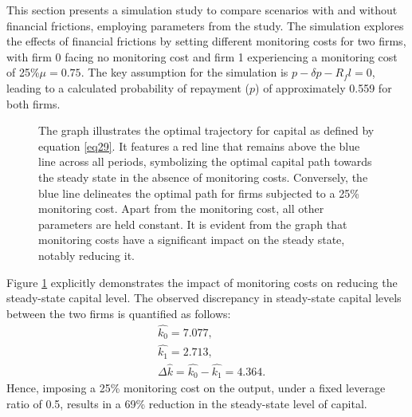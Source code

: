 \documentclass[12pt]{report}
\begin{document}
This section presents a simulation study to compare scenarios with and without financial frictions, employing parameters
from the \cite{OsePap17} study. The simulation explores the effects of financial frictions by setting different
monitoring costs for two firms, with firm 0 facing no monitoring cost and firm 1 experiencing a monitoring cost of
25\%\(\mu =0.75 \).
The key assumption for the simulation is \( p - \delta p - R_f l = 0 \), leading to a calculated probability of
repayment (\(p\)) of approximately 0.559 for both firms.



\begin{figure}
    \centering
    \caption{The graph illustrates the optimal trajectory for capital as defined by equation \ref{eq29}. It features a
    red line that remains above the blue line across all periods, symbolizing the optimal capital path towards the
    steady state in the absence of monitoring costs. Conversely, the blue line delineates the optimal path for firms
    subjected to a 25\% monitoring cost. Apart from the monitoring cost, all other parameters are held constant. It is
    evident from the graph that monitoring costs have a significant impact on the steady state, notably reducing it.
    }
    \label{fig:capitalEvolution}
\end{figure}
Figure \ref{fig:capitalEvolution} explicitly demonstrates the impact of monitoring costs on reducing the steady-state
capital level. The observed discrepancy in steady-state capital levels between the two firms is quantified as follows:
\begin{align*}
    &\hat{k_0} = 7.077, \\
    &\hat{k_1} = 2.713, \\
    &\Delta\hat{k} = \hat{k_0} - \hat{k_1} = 4.364.
\end{align*}
Hence, imposing a 25\% monitoring cost on the output, under a fixed leverage ratio of 0.5, results in a 69\% reduction
in the steady-state level of capital.
\end{document}
